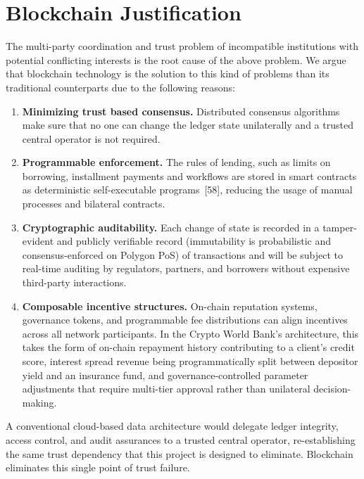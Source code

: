 \documentclass[12pt,a4paper]{report}
\begin{document}
\section{Blockchain Justification}

The multi-party coordination and trust problem of incompatible institutions with potential conflicting interests is the root cause of the above problem. We argue that blockchain technology is the solution to this kind of problems than its traditional counterparts due to the following reasons:

\begin{enumerate}[noitemsep]
\item \textbf{Minimizing trust based consensus.} Distributed consensus algorithms make sure that no one can change the ledger state unilaterally and a trusted central operator is not required.

\item \textbf{Programmable enforcement.} The rules of lending, such as limits on borrowing, installment payments and workflows are stored in smart contracts as deterministic self-executable programs~[58], reducing the usage of manual processes and bilateral contracts.

\item \textbf{Cryptographic auditability.} Each change of state is recorded in a tamper-evident and publicly verifiable record (immutability is probabilistic and consensus-enforced on Polygon PoS) of transactions and will be subject to real-time auditing by regulators, partners, and borrowers without expensive third-party interactions.

\item \textbf{Composable incentive structures.} On-chain reputation systems, governance tokens, and programmable fee distributions can align incentives across all network participants. In the Crypto World Bank's architecture, this takes the form of on-chain repayment history contributing to a client's credit score, interest spread revenue being programmatically split between depositor yield and an insurance fund, and governance-controlled parameter adjustments that require multi-tier approval rather than unilateral decision-making.
\end{enumerate}

A conventional cloud-based data architecture would delegate ledger integrity, access control, and audit assurances to a trusted central operator, re-establishing the same trust dependency that this project is designed to eliminate. Blockchain eliminates this single point of trust failure.
\end{document}
